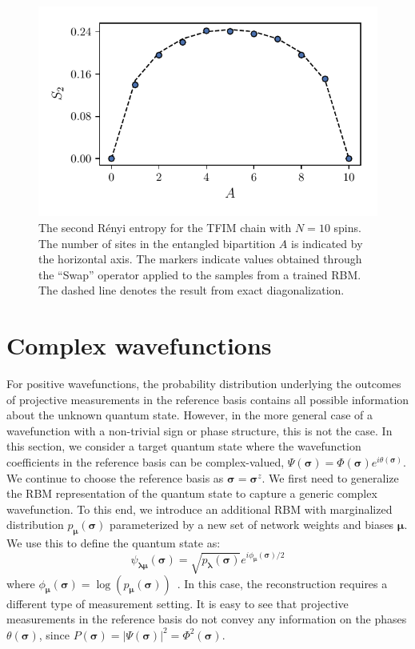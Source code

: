 \documentclass[submission, Phys, hidelnks]{SciPost}
\begin{document}
\begin{figure}[htb]
    \centering
    \includegraphics[]{ee}
    \caption{
        The second R\'enyi entropy for the TFIM chain with
        $N=10$ spins.
        The number of sites in the entangled bipartition $A$
        is indicated by the horizontal axis.
        The markers indicate values obtained through the
        ``Swap'' operator applied  to the samples from a trained RBM.\@
        The dashed line denotes the result from exact diagonalization.
    }\label{ee_learn}
\end{figure}

\section{Complex wavefunctions}\label{sec:complex}
For positive wavefunctions, the probability distribution underlying the outcomes
of projective measurements in the reference basis  contains all possible
information about the unknown quantum state.
However, in the more general case of a wavefunction with a non-trivial sign or
phase structure, this is not the case.
In this section, we consider a target quantum state where the wavefunction
coefficients in the reference basis can be
complex-valued, $\Psi(\bm{\sigma})=\Phi(\bm{\sigma})e^{i\theta(\bm{\sigma})}$.
We continue to choose the reference basis as $\bm{\sigma} = \bm{\sigma}^z$.
We first need to generalize the RBM representation of the quantum state to
capture a generic complex wavefunction. To this end, we introduce an additional RBM
with marginalized distribution $p_{\bm{\mu}}(\bm{\sigma})$ parameterized by a
new set of network weights and biases $\bm{\mu}$.
We use this to define the quantum state as:
\begin{equation}
    \psi_{\bm{\lambda} \bm{\mu}} (\bm{\sigma})= \sqrt{p_{\bm{\lambda}} (\bm{\sigma})} e^{i \phi_{\bm{\mu}} (\bm{\sigma})/2}
\end{equation}
where $\phi_{\bm{\mu}}(\bm{\sigma}) = \log (p_{\bm{\mu}} (\bm{\sigma}))$~\cite{torlai_neural-network_2018}.
In this case, the reconstruction requires a different type of measurement
setting. It is easy to see that projective measurements in the reference basis
do not convey any information on the phases $\theta(\bm{\sigma})$, since
$P(\bm{\sigma})=|\Psi(\bm{\sigma})|^2=\Phi^2(\bm{\sigma})$.
\end{document}
